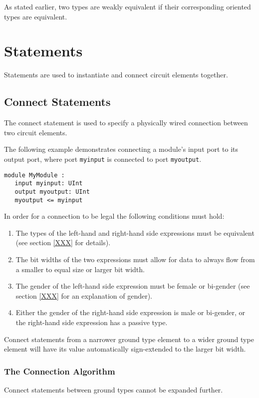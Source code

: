 \documentclass[12pt]{article}
\begin{document}
As stated earlier, two types are weakly equivalent if their corresponding oriented types are equivalent.


\section{Statements} \label{statements}

Statements are used to instantiate and connect circuit elements together.

\subsection{Connect Statements}
The connect statement is used to specify a physically wired connection between two circuit elements.

The following example demonstrates connecting a module's input port to its output port, where port \verb|myinput| is connected to port \verb|myoutput|.
\begin{verbatim}
module MyModule :
   input myinput: UInt
   output myoutput: UInt
   myoutput <= myinput
\end{verbatim}

In order for a connection to be legal the following conditions must hold:
\begin{enumerate}
\item The types of the left-hand and right-hand side expressions must be equivalent (see section \ref{XXX} for details).
\item The bit widths of the two expressions must allow for data to always flow from a smaller to equal size or larger bit width.
\item The gender of the left-hand side expression must be female or bi-gender (see section \ref{XXX} for an explanation of gender).
\item Either the gender of the right-hand side expression is male or bi-gender, or the right-hand side expression has a passive type.
\end{enumerate}

Connect statements from a narrower ground type element to a wider ground type element will have its value automatically sign-extended to the larger bit width. 

\subsubsection{The Connection Algorithm}
Connect statements between ground types cannot be expanded further. 
\end{document}
